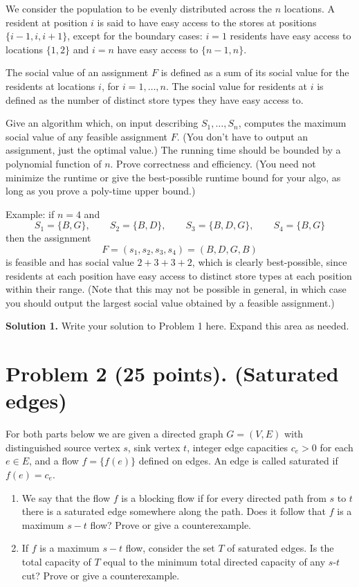 \documentclass[12pt]{article}
\begin{document}
We consider the population to be evenly distributed across the $n$ locations. A resident at position $i$ is said to have easy access to the stores at positions $\{i-1,i,i+1\}$, except for the boundary cases: $i=1$ residents have easy access to locations $\{1,2\}$ and $i=n$ have easy access to $\{n-1,n\}$.

The social value of an assignment $F$ is defined as a sum of its social value for the residents at locations $i$, for $i=1,\ldots,n$. The social value for residents at $i$ is defined as the number of distinct store types they have easy access to.

Give an algorithm which, on input describing $S_1,\ldots,S_n$, computes the maximum social value of any feasible assignment $F$. (You don't have to output an assignment, just the optimal value.) The running time should be bounded by a polynomial function of $n$. Prove correctness and efficiency. (You need not minimize the runtime or give the best-possible runtime bound for your algo, as long as you prove a poly-time upper bound.)

Example: if $n=4$ and
\[
S_1=\{B,G\}, \qquad S_2=\{B,D\}, \qquad S_3=\{B,D,G\}, \qquad S_4=\{B,G\}
\]
then the assignment
\[
F=(s_1,s_2,s_3,s_4)=(B,D,G,B)
\]
is feasible and has social value $2+3+3+2$, which is clearly best-possible, since residents at each position have easy access to distinct store types at each position within their range. (Note that this may not be possible in general, in which case you should output the largest social value obtained by a feasible assignment.)

\vspace{1em}
\noindent\textbf{Solution 1.} Write your solution to Problem 1 here. Expand this area as needed.

\newpage

\section*{Problem 2 (25 points). (Saturated edges)}

For both parts below we are given a directed graph $G=(V,E)$ with distinguished source vertex $s$, sink vertex $t$, integer edge capacities $c_e>0$ for each $e\in E$, and a flow $f=\{f(e)\}$ defined on edges. An edge is called saturated if $f(e)=c_e$.

\begin{enumerate}[label=(\alph*)]
\item We say that the flow $f$ is a blocking flow if for every directed path from $s$ to $t$ there is a saturated edge somewhere along the path. Does it follow that $f$ is a maximum $s-t$ flow? Prove or give a counterexample.

\item If $f$ is a maximum $s-t$ flow, consider the set $T$ of saturated edges. Is the total capacity of $T$ equal to the minimum total directed capacity of any $s$-$t$ cut? Prove or give a counterexample.
\end{enumerate}
\end{document}

